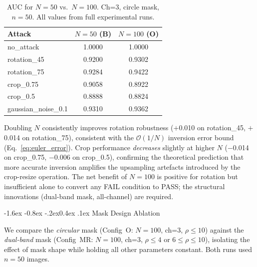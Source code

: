 \documentclass[10pt,twocolumn]{article}
\makeatletter
\renewcommand\subsection{\@startsection{subsection}{2}{\z@}%
  {-1.6ex \@plus -0.8ex \@minus -.2ex}{0.4ex \@plus .1ex}%
  {\normalfont\normalsize\itshape}}
\makeatother
\begin{document}
\begin{table}[htbp]
  \centering
  \caption{AUC for $N{=}50$ vs.\ $N{=}100$. Ch=3, circle mask, $n{=}50$.
    All values from full experimental runs.}
  \label{tab:step_ablation}
  \setlength{\tabcolsep}{4pt}
  \small
  \begin{tabular}{lcc}
    \toprule
    \textbf{Attack} & $N{=}50$ (B) & $N{=}100$ (O) \\
    \midrule
    no\_attack       & 1.0000 & 1.0000 \\
    rotation\_45     & 0.9200 & 0.9302 \\
    rotation\_75     & 0.9284 & 0.9422 \\
    crop\_0.75       & 0.9058 & 0.8922 \\
    crop\_0.5        & 0.8888 & 0.8824 \\
    gaussian\_noise\_0.1 & 0.9310 & 0.9362 \\
    \bottomrule
  \end{tabular}
\end{table}

Doubling $N$ consistently improves rotation robustness ($+$0.010 on
rotation\_45, $+$0.014 on rotation\_75), consistent with the
$\mathcal{O}(1/N)$ inversion error bound (Eq.~\ref{eq:euler_error}).
Crop performance \emph{decreases} slightly at higher $N$
($-$0.014 on crop\_0.75, $-$0.006 on crop\_0.5), confirming the
theoretical prediction that more accurate inversion amplifies the
upsampling artefacts introduced by the crop-resize operation.
The net benefit of $N{=}100$ is positive for rotation but insufficient
alone to convert any FAIL condition to PASS; the structural innovations
(dual-band mask, all-channel) are required.

\subsection{Mask Design Ablation}

We compare the \emph{circular} mask (Config~O: $N{=}100$, ch=3,
$\rho \le 10$) against the \emph{dual-band} mask (Config~MR: $N{=}100$,
ch=3, $\rho \le 4$ or $6 \le \rho \le 10$), isolating the effect
of mask shape while holding all other parameters constant.
Both runs used $n{=}50$ images.
\end{document}
